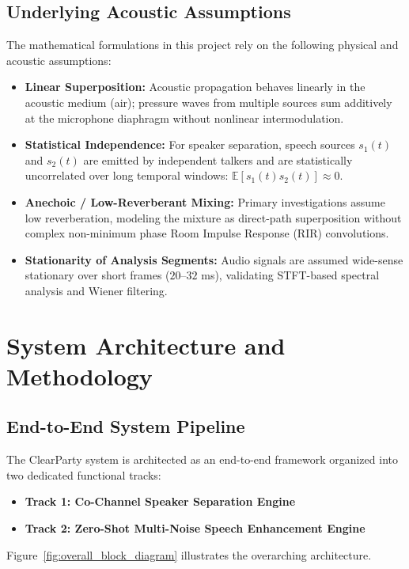 \documentclass[11pt,a4paper]{report}
\begin{document}
\section{Underlying Acoustic Assumptions}
The mathematical formulations in this project rely on the following physical and acoustic assumptions:
\begin{itemize}
    \item \textbf{Linear Superposition:} Acoustic propagation behaves linearly in the acoustic medium (air); pressure waves from multiple sources sum additively at the microphone diaphragm without nonlinear intermodulation.
    \item \textbf{Statistical Independence:} For speaker separation, speech sources $s_1(t)$ and $s_2(t)$ are emitted by independent talkers and are statistically uncorrelated over long temporal windows: $\mathbb{E}[s_1(t) s_2(t)] \approx 0$.
    \item \textbf{Anechoic / Low-Reverberant Mixing:} Primary investigations assume low reverberation, modeling the mixture as direct-path superposition without complex non-minimum phase Room Impulse Response (RIR) convolutions.
    \item \textbf{Stationarity of Analysis Segments:} Audio signals are assumed wide-sense stationary over short frames ($20$--$32$ ms), validating STFT-based spectral analysis and Wiener filtering.
\end{itemize}

\chapter{System Architecture and Methodology}
\label{chap:architecture}

\section{End-to-End System Pipeline}
The ClearParty system is architected as an end-to-end framework organized into two dedicated functional tracks:
\begin{itemize}
    \item \textbf{Track 1: Co-Channel Speaker Separation Engine}
    \item \textbf{Track 2: Zero-Shot Multi-Noise Speech Enhancement Engine}
\end{itemize}
Figure~\ref{fig:overall_block_diagram} illustrates the overarching architecture.
\end{document}
